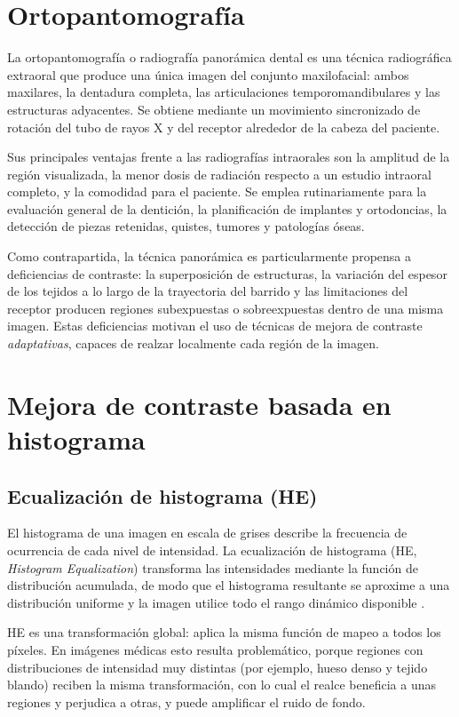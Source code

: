 \section{Ortopantomografía}

La ortopantomografía o radiografía panorámica dental es una técnica radiográfica extraoral que produce una única imagen del conjunto maxilofacial: ambos maxilares, la dentadura completa, las articulaciones temporomandibulares y las estructuras adyacentes. Se obtiene mediante un movimiento sincronizado de rotación del tubo de rayos X y del receptor alrededor de la cabeza del paciente.

Sus principales ventajas frente a las radiografías intraorales son la amplitud de la región visualizada, la menor dosis de radiación respecto a un estudio intraoral completo, y la comodidad para el paciente. Se emplea rutinariamente para la evaluación general de la dentición, la planificación de implantes y ortodoncias, la detección de piezas retenidas, quistes, tumores y patologías óseas.

Como contrapartida, la técnica panorámica es particularmente propensa a deficiencias de contraste: la superposición de estructuras, la variación del espesor de los tejidos a lo largo de la trayectoria del barrido y las limitaciones del receptor producen regiones subexpuestas o sobreexpuestas dentro de una misma imagen. Estas deficiencias motivan el uso de técnicas de mejora de contraste \textit{adaptativas}, capaces de realzar localmente cada región de la imagen.

\section{Mejora de contraste basada en histograma}

\subsection{Ecualización de histograma (HE)}

El histograma de una imagen en escala de grises describe la frecuencia de ocurrencia de cada nivel de intensidad. La ecualización de histograma (HE, \textit{Histogram Equalization}) transforma las intensidades mediante la función de distribución acumulada, de modo que el histograma resultante se aproxime a una distribución uniforme y la imagen utilice todo el rango dinámico disponible \citep{Gonzalez2018}.

HE es una transformación global: aplica la misma función de mapeo a todos los píxeles. En imágenes médicas esto resulta problemático, porque regiones con distribuciones de intensidad muy distintas (por ejemplo, hueso denso y tejido blando) reciben la misma transformación, con lo cual el realce beneficia a unas regiones y perjudica a otras, y puede amplificar el ruido de fondo.

